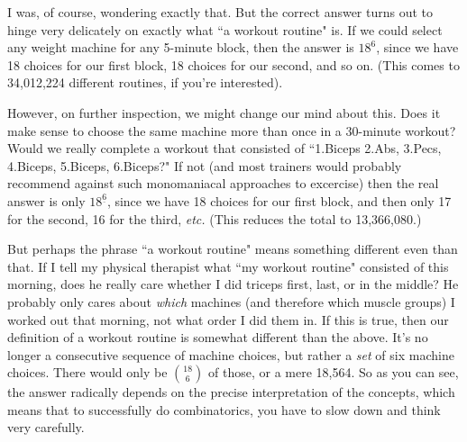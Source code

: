 I was, of course, wondering exactly that. But the correct answer turns out
to hinge very delicately on exactly what ``a workout routine" is. If we
could select any weight machine for any 5-minute block, then the answer is
$18^6$, since we have 18 choices for our first block, 18 choices for our
second, and so on. (This comes to 34,012,224 different routines, if you're
interested).

However, on further inspection, we might change our mind about this. Does
it make sense to choose the same machine more than once in a 30-minute
workout? Would we really complete a workout that consisted of ``1.Biceps
2.Abs, 3.Pecs, 4.Biceps, 5.Biceps, 6.Biceps?" If not (and most trainers
would probably recommend against such monomaniacal approaches to excercise)
then the real answer is only $18^{\underline{6}}$, since we have 18 choices
for our first block, and then only 17 for the second, 16 for the third,
\textit{etc.} (This reduces the total to 13,366,080.)

But perhaps the phrase ``a workout routine" means something different even
than that. If I tell my physical therapist what ``my workout routine"
consisted of this morning, does he really care whether I did triceps first,
last, or in the middle? He probably only cares about \textit{which}
machines (and therefore which muscle groups) I worked out that morning, not
what order I did them in. If this is true, then our definition of a workout
routine is somewhat different than the above. It's no longer a consecutive
sequence of machine choices, but rather a \textit{set} of six machine
choices. There would only be $\binom{18}{6}$ of those, or a mere 18,564. So
as you can see, the answer radically depends on the precise interpretation
of the concepts, which means that to successfully do combinatorics, you
have to slow down and think very carefully.
